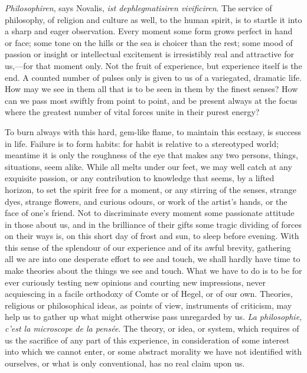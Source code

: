 \emph{Philosophiren}, says Novalis, \emph{ist dephlegmatisiren
vivificiren}. The service of philosophy, of religion and culture as
well, to the human spirit, is to startle it into a sharp and eager
observation. Every moment some form grows perfect in hand or face; some
tone on the hills or the sea is choicer than the rest; some mood of
passion or insight or intellectual excitement is irresistibly real and
attractive for us,---for that moment only. Not the fruit of experience,
but experience itself is the end. A counted number of pulses only is
given to us of a variegated, dramatic life. How may we see in them all
that is to be seen in them by the finest senses? How can we pass most
swiftly from point to point, and be present always at the focus where
the greatest number of vital forces unite in their purest energy?

To burn always with this hard, gem-like flame, to maintain this ecstasy,
is success in life. Failure is to form habits: for habit is relative to
a stereotyped world; meantime it is only the roughness of the eye that
makes any two persons, things, situations, seem alike. While all melts
under our feet, we may well catch at any exquisite passion, or any
contribution to knowledge that seems, by a lifted horizon, to set the
spirit free for a moment, or any stirring of the senses, strange dyes,
strange flowers, and curious odours, or work of the artist's hands, or
the face of one's friend. Not to discriminate every moment some
passionate attitude in those about us, and in the brilliance of their
gifts some tragic dividing of forces on their ways is, on this short day
of frost and sun, to sleep before evening. With this sense of the
splendour of our experience and of its awful brevity, gathering all we
are into one desperate effort to see and touch, we shall hardly have
time to make theories about the things we see and touch. What we have to
do is to be for ever curiously testing new opinions and courting new
impressions, never acquiescing in a facile orthodoxy of Comte or of
Hegel, or of our own. Theories, religious or philosophical ideas, as
points of view, instruments of criticism, may help us to gather up what
might otherwise pass unregarded by us. \emph{La philosophie, c'est la
microscope de la pensée}. The theory, or idea, or system, which requires
of us the sacrifice of any part of this experience, in consideration of
some interest into which we cannot enter, or some abstract morality we
have not identified with ourselves, or what is only conventional, has no
real claim upon us.


